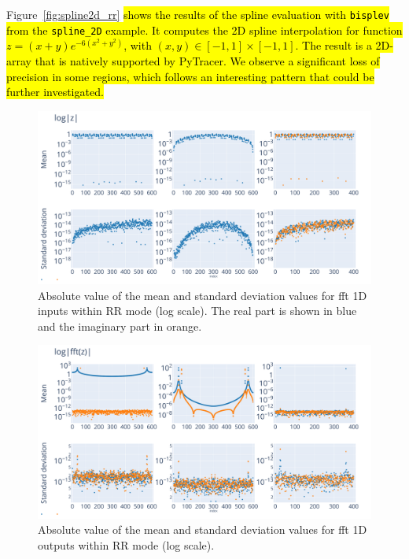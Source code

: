 \documentclass[10pt,journal,compsoc]{IEEEtran}
\DeclareRobustCommand{\add}[1]{\sethlcolor{lightgreen}\hl{#1}}
\DeclareRobustCommand{\add}[1]{#1}
\begin{document}
Figure~\ref{fig:spline2d_rr} \add{shows the results of the spline evaluation with
    \texttt{bisplev} from the \texttt{spline\_2D} example. It computes the 2D spline
    interpolation for function $z=(x+y)e^{-6(x^2+y^2)}$, with $(x,y) \in
        [-1,1]\times[-1,1]$. The result is a 2D-array that is natively supported by
    PyTracer. We observe a significant loss of precision in some regions, which follows
    an interesting pattern that could be further investigated.}


\begin{figure}
    \centering
    \includegraphics[width=\linewidth]{figure/FFT/fft_x.pdf}
    \caption{Absolute value of the mean and standard deviation values for fft 1D
        inputs within RR mode (log scale). The real part is shown in blue and
        the imaginary part in orange.}
    \label{fig:fft1D_inputs}
\end{figure}

\begin{figure}
    \centering
    \includegraphics[width=\linewidth]{figure/FFT/fft_y.pdf}
    \caption{Absolute value of the mean and standard deviation values
        for fft 1D outputs within RR mode (log scale).}
    \label{fig:fft1D_outputs}
\end{figure}
\end{document}
